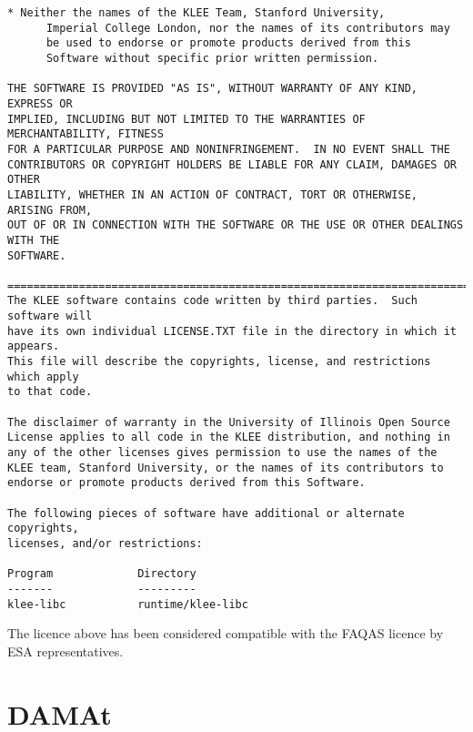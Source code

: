 \begin{lstlisting}[language={}]
    * Neither the names of the KLEE Team, Stanford University,
      Imperial College London, nor the names of its contributors may
      be used to endorse or promote products derived from this
      Software without specific prior written permission.

THE SOFTWARE IS PROVIDED "AS IS", WITHOUT WARRANTY OF ANY KIND, EXPRESS OR
IMPLIED, INCLUDING BUT NOT LIMITED TO THE WARRANTIES OF MERCHANTABILITY, FITNESS
FOR A PARTICULAR PURPOSE AND NONINFRINGEMENT.  IN NO EVENT SHALL THE
CONTRIBUTORS OR COPYRIGHT HOLDERS BE LIABLE FOR ANY CLAIM, DAMAGES OR OTHER
LIABILITY, WHETHER IN AN ACTION OF CONTRACT, TORT OR OTHERWISE, ARISING FROM,
OUT OF OR IN CONNECTION WITH THE SOFTWARE OR THE USE OR OTHER DEALINGS WITH THE
SOFTWARE.

==============================================================================
The KLEE software contains code written by third parties.  Such software will
have its own individual LICENSE.TXT file in the directory in which it appears.
This file will describe the copyrights, license, and restrictions which apply
to that code.

The disclaimer of warranty in the University of Illinois Open Source
License applies to all code in the KLEE distribution, and nothing in
any of the other licenses gives permission to use the names of the
KLEE team, Stanford University, or the names of its contributors to
endorse or promote products derived from this Software.

The following pieces of software have additional or alternate copyrights,
licenses, and/or restrictions:

Program             Directory
-------             ---------
klee-libc           runtime/klee-libc
\end{lstlisting}

The licence above has been considered compatible with the FAQAS licence by ESA representatives.

\section{DAMAt}